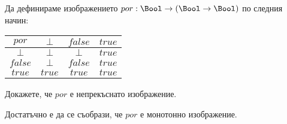   
  

\begin{problem}
  Да дефинираме изображението $por:\Bool \to (\Bool \to \Bool)$ по следния начин:

  \vspace{10pt}
  
  \begin{tabular}{|c|c|c|c|}
  \hline
  $por$ & $\bot$ & $false$ & $true$\\
  \hline
  $\bot$ & $\bot$ & $\bot$ & $true$\\
  \hline
  $false$ & $\bot$ & $false$ & $true$\\
  \hline
  $true$ & $true$ & $true$ & $true$\\
  \hline
\end{tabular}

\vspace{10pt}

  Докажете, че $por$ е непрекъснато изображение.
\end{problem}
\begin{hint}
  Достатъчно е да се съобрази, че $por$ е монотонно изображение.
\end{hint}





